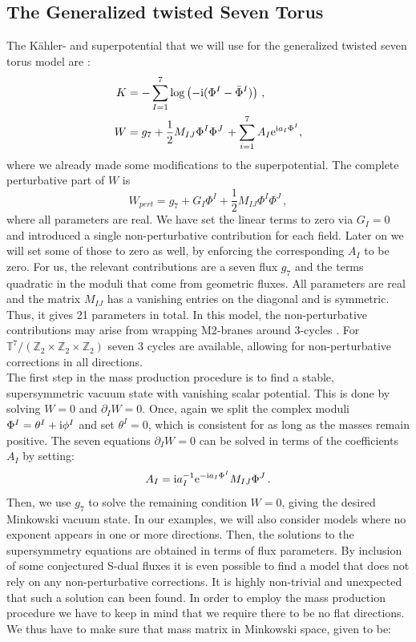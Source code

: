 \documentclass[a4paper,12pt]{report}
\newcommand{\be}{\begin{equation}}
\newcommand{\ee}{\end{equation}}
\newcommand{\bea}{\begin{equation}\begin{aligned}}
\newcommand{\eea}{\end{aligned}\end{equation}}
\def\rmi{{\rm i}}
\def\rme{{\rm e}}
\begin{document}
\subsection{The Generalized twisted Seven Torus}
The Kähler- and superpotential that we will use for the generalized twisted seven torus model are \cite{DallAgata:2005zlf,Derendinger:2014wwa}:
\bea 
\label{eq:mtheorypots}
K &= - \sum_{I=1}^7 \log \left( -\rmi (\Phi^I - \bar{\Phi}^I)\right)\,,\\
W &=  g_7 + \frac{1}{2} M_{IJ} \Phi^I \Phi^J\, + \sum_{i=1}^7 A_I \rme ^{\rmi a_I \Phi^I},
\eea
where we already made some modifications to the superpotential. The complete perturbative part of $W$ is 
\be
W_{pert} =  g_7 + G_I \Phi^I + \frac{1}{2} M_{IJ} \Phi^I \Phi^J\,,
\ee
where all parameters are real. We have set the linear terms to zero via $G_I =0$ and introduced a single non-perturbative contribution for each field. Later on we will set some of those to zero as well, by enforcing the corresponding $A_I$ to be zero. For us, the relevant contributions are a seven flux $g_7$ and the terms quadratic in the moduli that come from geometric fluxes. All parameters are real and the matrix $M_{IJ}$ has a vanishing entries on the diagonal and is symmetric. Thus, it gives 21 parameters in total. In this model, the non-perturbative contributions may arise from wrapping M2-branes around 3-cycles \cite{Harvey:1999as}. For $\mathbb{T} ^7/(\mathbb{Z}_2 \times \mathbb{Z}_2 \times \mathbb{Z}_2)$ seven 3 cycles are available, allowing for non-perturbative corrections in all directions.\\
The first step in the mass production procedure is to find a stable, supersymmetric vacuum state with vanishing scalar potential. This is done by solving $W = 0$ and $\partial_I W = 0$. Once, again we split the complex moduli $\Phi^I = \theta^I + \rmi \phi^I$ and set $\theta^I=0$, which is consistent for as long as the masses remain positive. The seven equations $\partial_I W =0$ can be solved in terms of the coefficients $A_I$ by setting:
\be 
A_I = \rmi a^{-1}_I \rme^{-\rmi a_I \Phi^I} M_{IJ} \Phi^J\,.
\ee
Then, we use $g_7$ to solve the remaining condition $W=0$, giving the desired Minkowski vacuum state. In our examples, we will also consider models where no exponent appears in one or more directions. Then, the solutions to the supersymmetry equations are obtained in terms of flux parameters. By inclusion of some conjectured S-dual fluxes it is even possible to find a model that does not rely on any non-perturbative corrections. It is highly non-trivial and unexpected that such a solution can been found. In order to employ the mass production procedure we have to keep in mind that we require there to be no flat directions. We thus have to make sure that mass matrix in Minkowski space, given to be:
\end{document}
